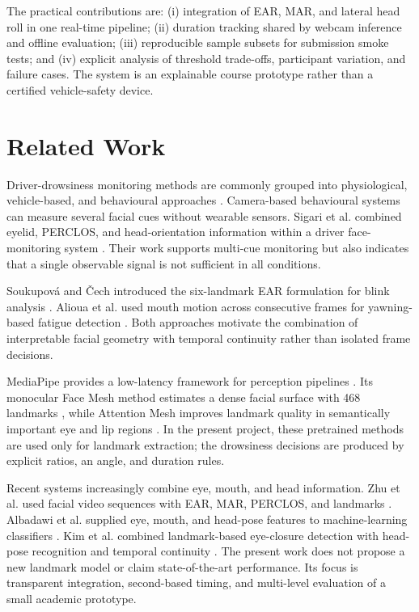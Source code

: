 \documentclass[runningheads]{llncs}
\begin{document}
The practical contributions are: (i) integration of EAR, MAR, and lateral head
roll in one real-time pipeline; (ii) duration tracking shared by webcam inference
and offline evaluation; (iii) reproducible sample subsets for submission smoke
tests; and (iv) explicit analysis of threshold trade-offs, participant variation,
and failure cases. The system is an explainable course prototype rather than a
certified vehicle-safety device.

\section{Related Work}

Driver-drowsiness monitoring methods are commonly grouped into physiological,
vehicle-based, and behavioural approaches \cite{sahayadhas2012review}. Camera-based behavioural systems can measure several facial cues without wearable
sensors. Sigari et al. combined eyelid, PERCLOS, and head-orientation information
within a driver face-monitoring system \cite{sigari2013monitoring}. Their work
supports multi-cue monitoring but also indicates that a single observable signal
is not sufficient in all conditions.

Soukupov\'a and \v{C}ech introduced the six-landmark EAR formulation for blink
analysis \cite{soukupova2016ear}. Alioua et al. used mouth motion across
consecutive frames for yawning-based fatigue detection \cite{alioua2014yawning}.
Both approaches motivate the combination of interpretable facial geometry with
temporal continuity rather than isolated frame decisions.

MediaPipe provides a low-latency framework for perception pipelines
\cite{lugaresi2019mediapipe}. Its monocular Face Mesh method estimates a dense
facial surface with 468 landmarks \cite{kartynnik2019facemesh}, while Attention
Mesh improves landmark quality in semantically important eye and lip regions
\cite{grishchenko2020attention}. In the present project, these pretrained methods
are used only for landmark extraction; the drowsiness decisions are produced by
explicit ratios, an angle, and duration rules.

Recent systems increasingly combine eye, mouth, and head information. Zhu et al.
used facial video sequences with EAR, MAR, PERCLOS, and landmarks
\cite{zhu2022fatigue}. Albadawi et al. supplied eye, mouth, and head-pose features
to machine-learning classifiers \cite{albadawi2023visual}. Kim et al. combined
landmark-based eye-closure detection with head-pose recognition and temporal
continuity \cite{kim2023monitoring}. The present work does not propose a new
landmark model or claim state-of-the-art performance. Its focus is transparent
integration, second-based timing, and multi-level evaluation of a small academic
prototype.
\end{document}
